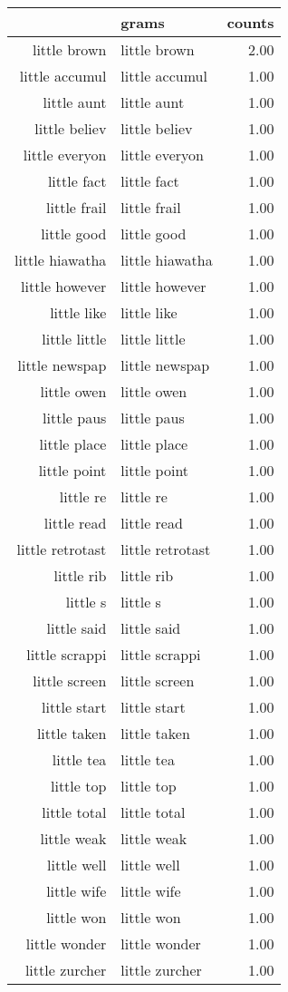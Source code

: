 \begin{table}[ht]
\centering
\begin{tabular}{rlr}
  \hline
 & grams & counts \\ 
  \hline
little brown & little brown & 2.00 \\ 
  little accumul & little accumul & 1.00 \\ 
  little aunt & little aunt & 1.00 \\ 
  little believ & little believ & 1.00 \\ 
  little everyon & little everyon & 1.00 \\ 
  little fact & little fact & 1.00 \\ 
  little frail & little frail & 1.00 \\ 
  little good & little good & 1.00 \\ 
  little hiawatha & little hiawatha & 1.00 \\ 
  little however & little however & 1.00 \\ 
  little like & little like & 1.00 \\ 
  little little & little little & 1.00 \\ 
  little newspap & little newspap & 1.00 \\ 
  little owen & little owen & 1.00 \\ 
  little paus & little paus & 1.00 \\ 
  little place & little place & 1.00 \\ 
  little point & little point & 1.00 \\ 
  little re & little re & 1.00 \\ 
  little read & little read & 1.00 \\ 
  little retrotast & little retrotast & 1.00 \\ 
  little rib & little rib & 1.00 \\ 
  little s & little s & 1.00 \\ 
  little said & little said & 1.00 \\ 
  little scrappi & little scrappi & 1.00 \\ 
  little screen & little screen & 1.00 \\ 
  little start & little start & 1.00 \\ 
  little taken & little taken & 1.00 \\ 
  little tea & little tea & 1.00 \\ 
  little top & little top & 1.00 \\ 
  little total & little total & 1.00 \\ 
  little weak & little weak & 1.00 \\ 
  little well & little well & 1.00 \\ 
  little wife & little wife & 1.00 \\ 
  little won & little won & 1.00 \\ 
  little wonder & little wonder & 1.00 \\ 
  little zurcher & little zurcher & 1.00 \\ 
   \hline
\end{tabular}
\end{table}
